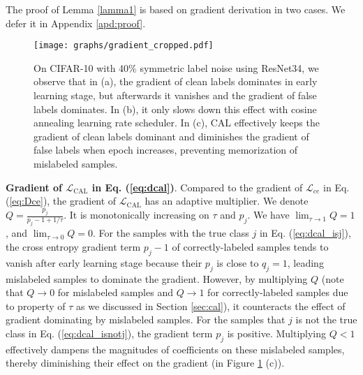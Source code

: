 \documentclass{article}
\begin{document}
The proof of Lemma \ref{lamma1} is based on gradient derivation in two cases. We defer it in Appendix \ref{apd:proof}.



\begin{figure}[t]
	\begin{center}
		\texttt{[image: graphs/gradient\_cropped.pdf]}
	\end{center}
	\caption{On CIFAR-10 with 40\% symmetric label noise using ResNet34, we observe that in (a),  the gradient of clean labels dominates in early learning stage, but afterwards it vanishes and the gradient of false labels dominates. In (b), it only slows down this effect with cosine annealing learning rate scheduler. In (c), CAL effectively keeps the gradient of clean labels dominant and diminishes the gradient of false labels when epoch increases, preventing memorization of mislabeled samples.}
\label{fig:gradient}
\end{figure}

\textbf{Gradient of $\mathcal{L}_\text{CAL}$ in Eq. (\ref{eq:dcal})}. Compared to the gradient of $\mathcal{L}_{ce}$ in Eq. (\ref{eq:Dce}), the gradient of $\mathcal{L}_\text{CAL}$ has an adaptive multiplier. We denote $Q=\frac{p_{j}}{p_{j}-1 +1/\tau}$. It is monotonically increasing on $\tau$ and $p_{j}$. We have $\lim_{\tau \rightarrow 1} Q = 1$, and $\lim_{\tau \rightarrow 0} Q = 0$. For the samples with the true class $j$ in Eq. (\ref{eq:dcal_isj}), the cross entropy gradient term $p_{j}-1$ of correctly-labeled samples tends to vanish after early learning stage because their $p_{j}$ is close to $q_{j}=1$, leading mislabeled samples to dominate the gradient. However, by multiplying $Q$ (note that $Q \rightarrow 0$ for mislabeled samples and $Q \rightarrow 1$ for correctly-labeled samples due to property of $\tau$ as we discussed in Section \ref{sec:cal}), it counteracts the effect of gradient dominating by mislabeled samples. For the samples that $j$ is not the true class in Eq. (\ref{eq:dcal_isnotj}), the gradient term $p_{j}$ is positive. Multiplying $Q<1$ effectively dampens the magnitudes of coefficients on these mislabeled samples, thereby diminishing their effect on the gradient (in Figure \ref{fig:gradient} (c)). 
\end{document}
